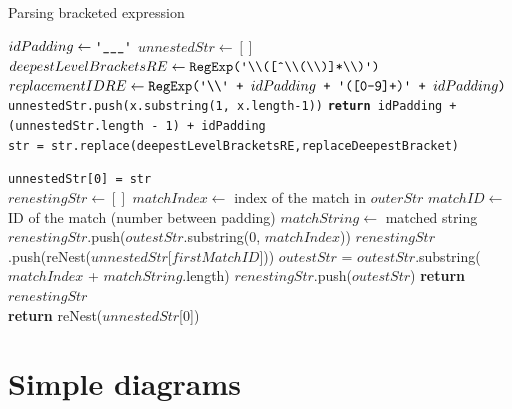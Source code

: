 \begin{algorithm}[!htbp]
\caption{Parsing bracketed expression}\label{alg:parenthesis}
\begin{algorithmic}[1]

   \State $idPadding\gets \texttt{\upquote{\_\_\_}}$
   \State $unnestedStr\gets []$
   \State $deepestLevelBracketsRE\gets \texttt{RegExp(\upquote{\textbackslash\textbackslash([\^{}\textbackslash\textbackslash(\textbackslash\textbackslash)]*\textbackslash\textbackslash)})}$
   \State $replacementIDRE\gets \texttt{RegExp(\upquote{\textbackslash\textbackslash} + }idPadding\texttt{ + \upquote{([0-9]+)} + }idPadding\texttt{)}$\\

     \State \texttt{unnestedStr.push(x.substring(1, x.length-1))}
     \State \texttt{\textbf{return} idPadding + (unnestedStr.length - 1) + idPadding}
   \EndProcedure \\

     \State \texttt{str = str.replace(deepestLevelBracketsRE,replaceDeepestBracket)}
   \EndWhile

   \State \texttt{unnestedStr[0] = str}\\

     \State $renestingStr\gets []$
       \State $matchIndex\gets$ index of the match in $outerStr$
       \State $matchID\gets$ ID of the match (number between padding)
       \State $matchString\gets$ matched string\\

				\State $renestingStr$.push($outestStr$.substring(0, $matchIndex$))
			\EndIf
			\State $renestingStr$.push(reNest($unnestedStr$[$firstMatchID$]))
			\State $outestStr$ = $outestStr$.substring($matchIndex$ + $matchString$.length)
     \EndWhile
     \State $renestingStr$.push($outestStr$)
     \State \textbf{return} $renestingStr$
   \EndProcedure \\

   \State \textbf{return} reNest($unnestedStr$[0])

\EndProcedure
\end{algorithmic}
\end{algorithm}

\section{Simple diagrams}

